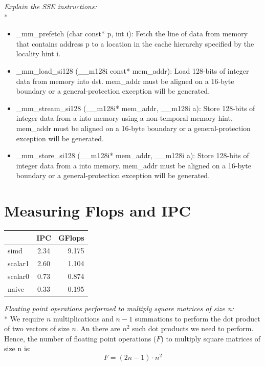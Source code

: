 \documentclass[11pt,letter]{article}
\begin{document}
\noindent\emph{Explain the SSE instructions:}\\*
\begin{itemize}
\item \textsf{\_mm\_prefetch (char const* p, int i)}: Fetch the line of data from memory that contains address p to a location in the cache hierarchy specified by the locality hint i.
\item \textsf{\_mm\_load\_si128 (\_\_m128i const* mem\_addr)}: Load 128-bits of integer data from memory into dst. mem\_addr must be aligned on a 16-byte boundary or a general-protection exception will be generated.
\item \textsf{\_mm\_stream\_si128 (\_\_m128i* mem\_addr, \_\_m128i a)}: Store 128-bits of integer data from a into memory using a non-temporal memory hint. mem\_addr must be aligned on a 16-byte boundary or a general-protection exception will be generated.
\item \textsf{\_mm\_store\_si128 (\_\_m128i* mem\_addr, \_\_m128i a)}: Store 128-bits of integer data from a into memory. mem\_addr must be aligned on a 16-byte boundary or a general-protection exception will be generated.
\end{itemize}




\section{Measuring Flops and IPC}

\begin{center}
  \begin{tabular}{ l | c | r }

       & IPC & GFlops \\ \hline
    simd & 2.34 & 9.175 \\ \hline
    scalar1 & 2.60 & 1.104 \\ \hline
    scalar0 & 0.73 & 0.874 \\ \hline
    naive & 0.33 & 0.195 \\

  \end{tabular}
\end{center}

\noindent\emph{Floating point operations performed to multiply square matrices of size n:}\\*
We require $n$ multiplications and $n - 1$ summations to perform the dot product of two vectors of size $n$. An there are $n^2$ such dot products we need to perform. Hence, the number of floating point operations ($F$) to multiply square matrices of size n is: 
$$F = (2n - 1) \cdot n^2$$\\[10pt]
\end{document}
